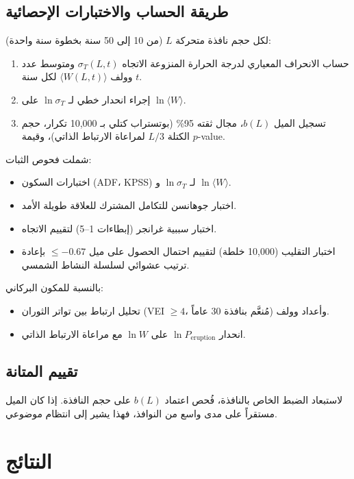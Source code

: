 \documentclass[11pt,a4paper]{article}
\begin{document}
	\subsection{طريقة الحساب والاختبارات الإحصائية}
	
	لكل حجم نافذة متحركة \(L\) (من 10 إلى 50 سنة بخطوة سنة واحدة):
	\begin{enumerate}
		\item حساب الانحراف المعياري لدرجة الحرارة المنزوعة الاتجاه \(\sigma_T(L,t)\) ومتوسط عدد وولف \(\langle W(L,t) \rangle\) لكل سنة \(t\).
		\item إجراء انحدار خطي لـ \(\ln \sigma_T\) على \(\ln \langle W \rangle\).
		\item تسجيل الميل \(b(L)\)، مجال ثقته 95\% (بوتستراب كتلي بـ 10,000 تكرار، حجم الكتلة \(L/3\) لمراعاة الارتباط الذاتي)، وقيمة \(p\)-value.
	\end{enumerate}
	
	شملت فحوص الثبات:
	\begin{itemize}
		\item اختبارات السكون (ADF، KPSS) لـ \(\ln \sigma_T\) و \(\ln \langle W \rangle\).
		\item اختبار جوهانسن للتكامل المشترك للعلاقة طويلة الأمد.
		\item اختبار سببية غرانجر (إبطاءات 1–5) لتقييم الاتجاه.
		\item اختبار التقليب (10,000 خلطة) لتقييم احتمال الحصول على ميل \(\le -0.67\) بإعادة ترتيب عشوائي لسلسلة النشاط الشمسي.
	\end{itemize}
	
	بالنسبة للمكون البركاني:
	\begin{itemize}
		\item تحليل ارتباط بين تواتر الثوران (VEI \(\ge 4\)، مُنعَّم بنافذة 30 عاماً) وأعداد وولف.
		\item انحدار \(\ln P_{\text{eruption}}\) على \(\ln W\) مع مراعاة الارتباط الذاتي.
	\end{itemize}
	
	\subsection{تقييم المتانة}
	
	لاستبعاد الضبط الخاص بالنافذة، فُحص اعتماد \(b(L)\) على حجم النافذة. إذا كان الميل مستقراً على مدى واسع من النوافذ، فهذا يشير إلى انتظام موضوعي.
	
	\section{النتائج}
	
\end{document}
